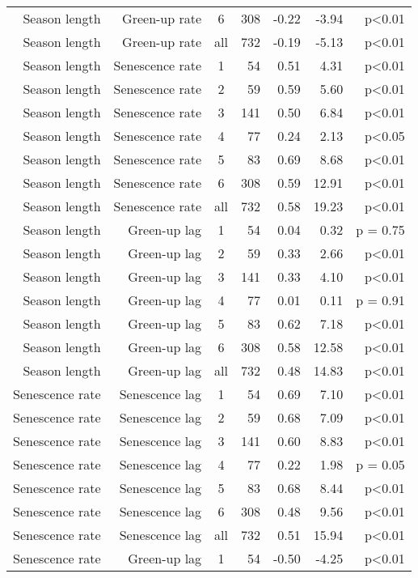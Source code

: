 \begin{table}[H]
\begin{tabular}{rrcrrrr}
  Season length & Green-up rate & 6 & 308 & -0.22 & -3.94 & p<0.01 \\ 
  Season length & Green-up rate & all & 732 & -0.19 & -5.13 & p<0.01 \\ 
   \hline
Season length & Senescence rate & 1 &  54 & 0.51 & 4.31 & p<0.01 \\ 
  Season length & Senescence rate & 2 &  59 & 0.59 & 5.60 & p<0.01 \\ 
  Season length & Senescence rate & 3 & 141 & 0.50 & 6.84 & p<0.01 \\ 
  Season length & Senescence rate & 4 &  77 & 0.24 & 2.13 & p<0.05 \\ 
  Season length & Senescence rate & 5 &  83 & 0.69 & 8.68 & p<0.01 \\ 
  Season length & Senescence rate & 6 & 308 & 0.59 & 12.91 & p<0.01 \\ 
  Season length & Senescence rate & all & 732 & 0.58 & 19.23 & p<0.01 \\ 
   \hline
Season length & Green-up lag & 1 &  54 & 0.04 & 0.32 & p = 0.75 \\ 
  Season length & Green-up lag & 2 &  59 & 0.33 & 2.66 & p<0.01 \\ 
  Season length & Green-up lag & 3 & 141 & 0.33 & 4.10 & p<0.01 \\ 
  Season length & Green-up lag & 4 &  77 & 0.01 & 0.11 & p = 0.91 \\ 
  Season length & Green-up lag & 5 &  83 & 0.62 & 7.18 & p<0.01 \\ 
  Season length & Green-up lag & 6 & 308 & 0.58 & 12.58 & p<0.01 \\ 
  Season length & Green-up lag & all & 732 & 0.48 & 14.83 & p<0.01 \\ 
   \hline
Senescence rate & Senescence lag & 1 &  54 & 0.69 & 7.10 & p<0.01 \\ 
  Senescence rate & Senescence lag & 2 &  59 & 0.68 & 7.09 & p<0.01 \\ 
  Senescence rate & Senescence lag & 3 & 141 & 0.60 & 8.83 & p<0.01 \\ 
  Senescence rate & Senescence lag & 4 &  77 & 0.22 & 1.98 & p = 0.05 \\ 
  Senescence rate & Senescence lag & 5 &  83 & 0.68 & 8.44 & p<0.01 \\ 
  Senescence rate & Senescence lag & 6 & 308 & 0.48 & 9.56 & p<0.01 \\ 
  Senescence rate & Senescence lag & all & 732 & 0.51 & 15.94 & p<0.01 \\ 
   \hline
Senescence rate & Green-up lag & 1 &  54 & -0.50 & -4.25 & p<0.01 \\ 

\end{tabular}
\end{table}
